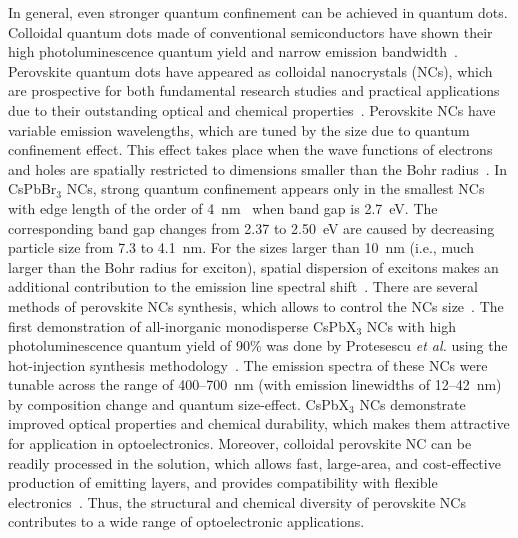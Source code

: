 \documentclass[journal=chreay,manuscript=review]{achemso}
\begin{document}
In general, even stronger quantum confinement can be achieved in quantum dots. Colloidal quantum dots made of conventional semiconductors have shown their high photoluminescence quantum yield and narrow emission bandwidth~\cite{shirasaki2013emergence}. Perovskite quantum dots have appeared as colloidal nanocrystals (NCs), which are prospective for both fundamental research studies and practical applications due to their outstanding optical and chemical properties~\cite{shamsi2019metal,dey2021state}. Perovskite NCs have variable emission wavelengths, which are tuned by the size due to quantum confinement effect. This effect takes place when the wave functions of electrons and holes are spatially restricted to dimensions smaller than the Bohr radius~\cite{sercel2019exciton}. In CsPbBr$_3$ NCs, strong quantum confinement appears only in the smallest NCs with edge length of the order of 4~nm~\cite{bucher2019tailoring} when band gap is 2.7~eV. The corresponding band gap changes from 2.37 to 2.50~eV are caused by decreasing particle size from 7.3 to 4.1~nm. For the sizes larger than 10~nm (i.e., much larger than the Bohr radius for exciton), spatial dispersion of excitons makes an additional contribution to the emission line spectral shift~\cite{berestennikov2019beyond}. There are several methods of perovskite NCs synthesis, which allows to control the NCs size~\cite{zhang2015brightly,lignos2016synthesis, hou2017synthesis, protesescu2015nanocrystals}. The first demonstration of all-inorganic monodisperse CsPbX$_3$ NCs with high photoluminescence quantum yield of 90\% was done by Protesescu \textit{et al.} using the hot-injection synthesis methodology~\cite{protesescu2015nanocrystals}. The emission spectra of these NCs were tunable across the range of 400–700~nm (with emission linewidths of 12–42~nm) by composition change and quantum size-effect. CsPbX$_3$ NCs demonstrate improved optical properties and  chemical durability, which makes them attractive for application in optoelectronics. Moreover, colloidal perovskite NC can be readily processed in the solution, which allows fast, large-area, and cost-effective production of emitting layers, and provides compatibility with flexible electronics~\cite{wang2018perovskite1, zhao2017highly}. Thus, the structural and chemical diversity of perovskite NCs contributes to a wide range of optoelectronic applications\cite{kovalenko2017properties}.

\end{document}
